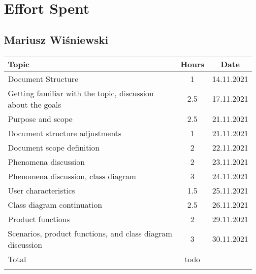 \chapter{Effort Spent}

\section*{Mariusz Wiśniewski}
\begin{table}[H]
    \centering
    \begin{tabular}{lcc} \Xhline{1.5pt}
        Topic & Hours & Date\\ \hline
        Document Structure & 1 & 14.11.2021\\ 
        Getting familiar with the topic, discussion about the goals & 2.5 & 17.11.2021\\ 
        Purpose and scope & 2.5 & 21.11.2021\\ 
        Document structure adjustments & 1 & 21.11.2021\\
        Document scope definition & 2 & 22.11.2021\\
        Phenomena discussion & 2 & 23.11.2021\\
        Phenomena discussion, class diagram & 3 & 24.11.2021\\ 
        User characteristics & 1.5 & 25.11.2021\\ 
        Class diagram continuation & 2.5 & 26.11.2021 \\ 
        Product functions & 2 & 29.11.2021 \\
        Scenarios, product functions, and class diagram discussion & 3 & 30.11.2021\\ \hline
        Total & todo &\\ \Xhline{1.5pt}
    \end{tabular}
\end{table}


